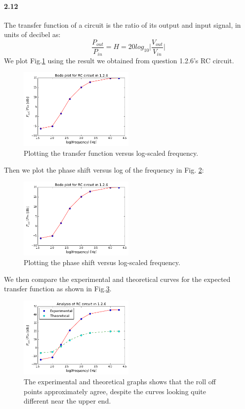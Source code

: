 \documentclass[authoryear, 12pt,5p, times]{elsarticle}
\begin{document}
\paragraph{\textbf{2.12}}
The transfer function of a circuit is the ratio of its output and input signal, in units of decibel as: 
\begin{equation}
\frac{P_{out}}{P_{in}} = H = 20 log_{10} \Bigg|\frac{V_{out}}{V_{in}}\Bigg|
\end{equation}
We plot Fig.\ref{bode} using the result we obtained from question 1.2.6's RC circuit.
\begin{figure}[h!]
\includegraphics[width=0.5\textwidth]{figure/bode}
\caption{Plotting the transfer function versus log-scaled frequency.}
\label{bode}
\end{figure}
Then we plot the phase shift versus log of the frequency in Fig. \ref{phase2}:
\begin{figure}[h!]
\includegraphics[width=0.5\textwidth]{figure/bode}
\caption{Plotting the phase shift versus log-scaled frequency.}
\label{phase2}
\end{figure}
We then compare the experimental and theoretical curves for the expected transfer function as shown in Fig.\ref{thexp}.
\begin{figure}[h!]
\includegraphics[width=0.5\textwidth]{figure/experiment_theory}
\caption{The experimental and theoretical graphs  shows that the roll off points approximately agree, despite the curves looking quite different near the upper end.}
\label{thexp}
\end{figure}
\end{document}
